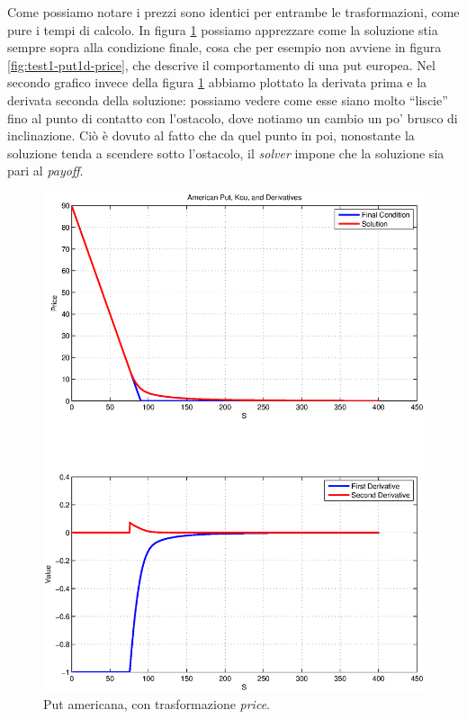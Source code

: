 \documentclass[a4paper,10pt]{report}
\theoremstyle{plain}
\theoremstyle{definition}
\theoremstyle{remark}
\begin{document}
Come possiamo notare i prezzi sono identici per entrambe le trasformazioni, come pure i tempi di calcolo. In figura \ref{fig:test2-putamkou} possiamo apprezzare come la soluzione stia sempre sopra alla condizione finale, cosa che per esempio non avviene in figura \ref{fig:test1-put1d-price}, che descrive il comportamento di una put europea. Nel secondo grafico invece della figura \ref{fig:test2-putamkou} abbiamo plottato la derivata prima e la derivata seconda della soluzione: possiamo vedere come esse siano molto ``liscie'' fino al punto di contatto con l'ostacolo, dove notiamo un cambio un po' brusco di inclinazione. Ci\`o \`e dovuto al fatto che da quel punto in poi, nonostante la soluzione tenda a scendere sotto l'ostacolo, il \emph{solver} impone che la soluzione sia pari al \emph{payoff}.
\begin{figure}[htp!]
\begin{center}
\includegraphics[width=\textwidth]{img/test2-putamkou.eps}
\caption{Put americana, con trasformazione \emph{price}.}
\label{fig:test2-putamkou}
\end{center}
\end{figure}
\newpage
\end{document}
